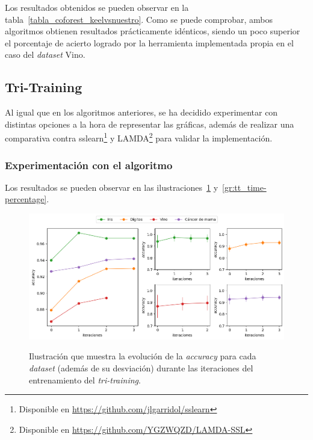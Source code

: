 Los resultados obtenidos se pueden observar en la tabla~\ref{tabla_coforest_keelvsnuestro}. Como se puede comprobar, ambos algoritmos obtienen resultados prácticamente idénticos, siendo un poco superior el porcentaje de acierto logrado por la herramienta implementada propia en el caso del \textit{dataset} Vino.


\subsection{Tri-Training}
\label{tritraining-exp}

Al igual que en los algoritmos anteriores, se ha decidido experimentar con distintas opciones a la hora de representar las gráficas, además de realizar una comparativa contra sslearn\footnote{ Disponible en {\url{https://github.com/jlgarridol/sslearn}}} y LAMDA\footnote{Disponible en {\url{https://github.com/YGZWQZD/LAMDA-SSL}}} para validar la implementación.


\subsubsection{Experimentación con el algoritmo}

Los resultados se pueden observar en las ilustraciones~\ref{gr:tt_train-iterations} y~\ref{gr:tt_time-percentage}.

\begin{figure}[h]
	\caption[\textit{Tri-training}: resultados (iteraciones-entrenamiento)]{Ilustración que muestra la evolución de la \textit{accuracy} para cada \textit{dataset} (además de su desviación) durante las iteraciones del entrenamiento del \textit{tri-training}.}
	\centering
	\includegraphics[scale=0.5]{../img/memoria/5_tritraining_score-iteraciones}
	\label{gr:tt_train-iterations}
\end{figure}

